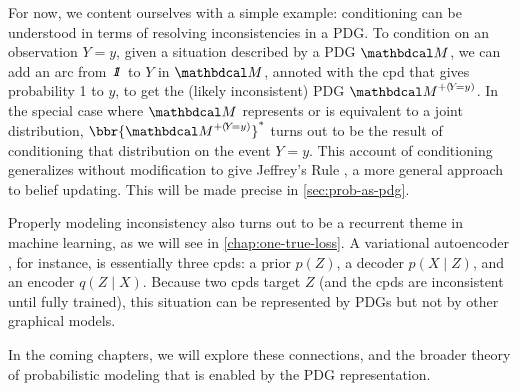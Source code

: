 For now, we content ourselves with a simple example:
conditioning can be understood in terms of resolving inconsistencies
in a PDG.  To condition on an observation $Y\!=\!y$, given a situation
described by a PDG $\dg M$, we can add an arc 
from $\pdgunit$ to $Y$ in $\dg M$, annoted with the cpd that gives
probability 1 to $y$, to get the (likely inconsistent) PDG
${\dg M}^{+(\!Y\!=y)}$.   
In the special case where $\dg M$ represents or is equivalent to a joint distribution,
    $\bbr{{\dg M}^{+(\!Y\!=y)}}^*$ turns out
    to be the result of conditioning that distribution on the event $Y{=}y$. 
This account of conditioning generalizes
without modification to give Jeffrey's Rule \citep{Jeffrey68}, a more
general approach to belief updating. 
This will be made precise in \cref{sec:prob-as-pdg}.

Properly modeling inconsistency also turns out to be a recurrent theme in machine learning, as we will see in \cref{chap:one-true-loss}. 
A variational autoencoder \citep{kingma2013autoencoding}, for instance, 
is essentially three cpds: a prior $p(Z)$, a decoder $p(X \!\mid\! Z)$, and 
an encoder $q(Z \!\mid\! X)$. Because two cpds target $Z$ (and the cpds are 
inconsistent until fully trained), this situation
can be represented by PDGs but not by other graphical models.

In the coming chapters, we will explore these connections, and the broader theory of probabilistic modeling that is enabled by the PDG representation.
	
